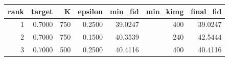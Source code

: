 \begin{tabular}{rrrrrrr}
\toprule
 rank &  target &   K &  epsilon &  min\_fid &  min\_kimg &  final\_fid \\
\midrule
    1 &  0.7000 & 750 &   0.2500 &  39.0247 &       400 &    39.0247 \\
    2 &  0.7000 & 750 &   0.1500 &  40.3539 &       240 &    42.5444 \\
    3 &  0.7000 & 500 &   0.2500 &  40.4116 &       400 &    40.4116 \\
\bottomrule
\end{tabular}
